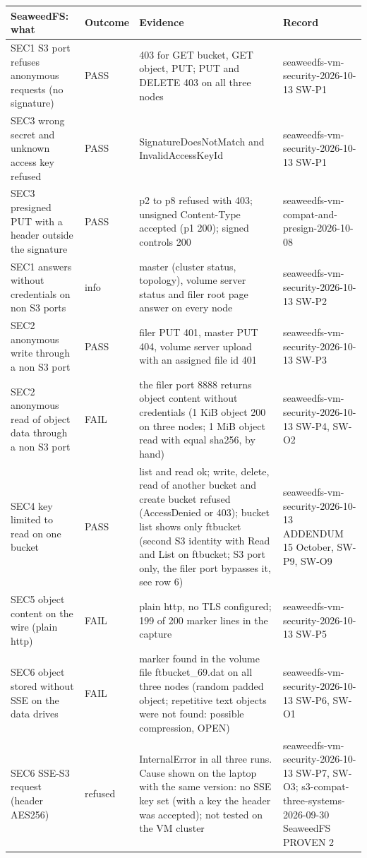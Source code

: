 \begin{tabular}{@{}p{3.6cm}lp{7.4cm}p{3.6cm}@{}}
\toprule
SeaweedFS: what & Outcome & Evidence & Record \\
\midrule
SEC1 S3 port refuses anonymous requests (no signature) & PASS & 403 for GET bucket, GET object, PUT; PUT and DELETE 403 on all three nodes & seaweedfs-vm-security-2026-10-13 SW-P1 \\
SEC3 wrong secret and unknown access key refused & PASS & SignatureDoesNotMatch and InvalidAccessKeyId & seaweedfs-vm-security-2026-10-13 SW-P1 \\
SEC3 presigned PUT with a header outside the signature & PASS & p2 to p8 refused with 403; unsigned Content-Type accepted (p1 200); signed controls 200 & seaweedfs-vm-compat-and-presign-2026-10-08 \\
SEC1 answers without credentials on non S3 ports & info & master (cluster status, topology), volume server status and filer root page answer on every node & seaweedfs-vm-security-2026-10-13 SW-P2 \\
SEC2 anonymous write through a non S3 port & PASS & filer PUT 401, master PUT 404, volume server upload with an assigned file id 401 & seaweedfs-vm-security-2026-10-13 SW-P3 \\
SEC2 anonymous read of object data through a non S3 port & FAIL & the filer port 8888 returns object content without credentials (1 KiB object 200 on three nodes; 1 MiB object read with equal sha256, by hand) & seaweedfs-vm-security-2026-10-13 SW-P4, SW-O2 \\
SEC4 key limited to read on one bucket & PASS & list and read ok; write, delete, read of another bucket and create bucket refused (AccessDenied or 403); bucket list shows only ftbucket (second S3 identity with Read and List on ftbucket; S3 port only, the filer port bypasses it, see row 6) & seaweedfs-vm-security-2026-10-13 ADDENDUM 15 October, SW-P9, SW-O9 \\
SEC5 object content on the wire (plain http) & FAIL & plain http, no TLS configured; 199 of 200 marker lines in the capture & seaweedfs-vm-security-2026-10-13 SW-P5 \\
SEC6 object stored without SSE on the data drives & FAIL & marker found in the volume file ftbucket\_69.dat on all three nodes (random padded object; repetitive text objects were not found: possible compression, OPEN) & seaweedfs-vm-security-2026-10-13 SW-P6, SW-O1 \\
SEC6 SSE-S3 request (header AES256) & refused & InternalError in all three runs. Cause shown on the laptop with the same version: no SSE key set (with a key the header was accepted); not tested on the VM cluster & seaweedfs-vm-security-2026-10-13 SW-P7, SW-O3; s3-compat-three-systems-2026-09-30 SeaweedFS PROVEN 2 \\

\end{tabular}
